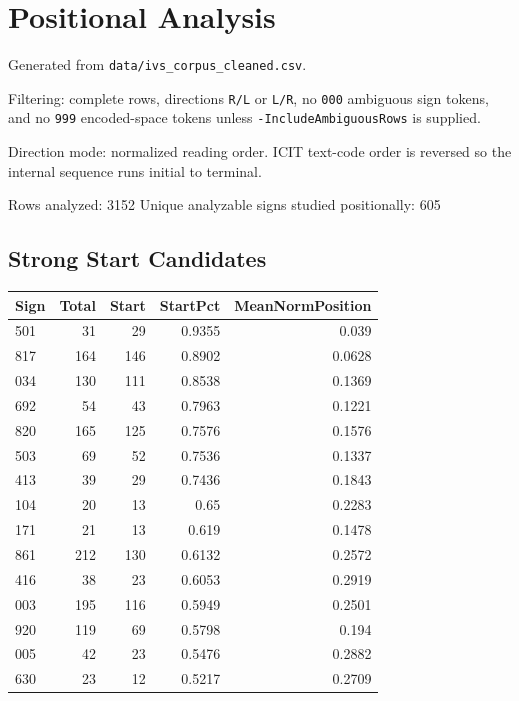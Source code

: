 ﻿\documentclass[11pt,a4paper]{article}
\begin{document}
\section*{Positional Analysis}

Generated from \texttt{data/ivs\_corpus\_cleaned.csv}.

Filtering: complete rows, directions \texttt{R/L} or \texttt{L/R}, no \texttt{000} ambiguous sign tokens, and no \texttt{999} encoded-space tokens unless \texttt{-IncludeAmbiguousRows} is supplied.

Direction mode: normalized reading order. ICIT text-code order is reversed so the internal sequence runs initial to terminal.

Rows analyzed: 3152
Unique analyzable signs studied positionally: 605

\subsection*{Strong Start Candidates}

\begin{center}
\begin{tabular}{lrrrr}
\toprule
\textbf{Sign} & \textbf{Total} & \textbf{Start} & \textbf{StartPct} & \textbf{MeanNormPosition} \\
\midrule
501 & 31 & 29 & 0.9355 & 0.039 \\
817 & 164 & 146 & 0.8902 & 0.0628 \\
034 & 130 & 111 & 0.8538 & 0.1369 \\
692 & 54 & 43 & 0.7963 & 0.1221 \\
820 & 165 & 125 & 0.7576 & 0.1576 \\
503 & 69 & 52 & 0.7536 & 0.1337 \\
413 & 39 & 29 & 0.7436 & 0.1843 \\
104 & 20 & 13 & 0.65 & 0.2283 \\
171 & 21 & 13 & 0.619 & 0.1478 \\
861 & 212 & 130 & 0.6132 & 0.2572 \\
416 & 38 & 23 & 0.6053 & 0.2919 \\
003 & 195 & 116 & 0.5949 & 0.2501 \\
920 & 119 & 69 & 0.5798 & 0.194 \\
005 & 42 & 23 & 0.5476 & 0.2882 \\
630 & 23 & 12 & 0.5217 & 0.2709 \\
\bottomrule
\end{tabular}
\end{center}
\end{document}
